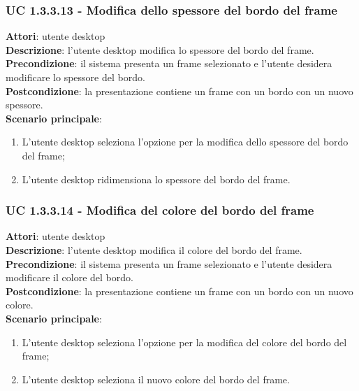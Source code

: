 \subsubsection{UC 1.3.3.13 - Modifica dello spessore del bordo del frame}{
	\label{uc1.3.3.13}
	\textbf{Attori}: utente desktop \\
	\textbf{Descrizione}: l'utente desktop modifica lo spessore del bordo del frame. \\
	\textbf{Precondizione}: il sistema presenta un frame selezionato e l'utente desidera modificare lo spessore del bordo.	\\
	\textbf{Postcondizione}: la presentazione contiene un frame con un bordo con un nuovo spessore.	\\
	\textbf{Scenario principale}:
	\begin{enumerate}
		\item L'utente desktop seleziona l'opzione per la modifica dello spessore del bordo del frame;
		\item L'utente desktop ridimensiona lo spessore del bordo del frame.
	\end{enumerate}
	}
\subsubsection{UC 1.3.3.14 - Modifica del colore del bordo del frame}{
	\label{uc1.3.3.14}
	\textbf{Attori}: utente desktop \\
	\textbf{Descrizione}: l'utente desktop modifica il colore del bordo del frame. \\
	\textbf{Precondizione}: il sistema presenta un frame selezionato e l'utente desidera modificare il colore del bordo.	\\
	\textbf{Postcondizione}: la presentazione contiene un frame con un bordo con un nuovo colore.	\\
	\textbf{Scenario principale}:
	\begin{enumerate}
		\item L'utente desktop seleziona l'opzione per la modifica del colore del bordo del frame;
		\item L'utente desktop seleziona il nuovo colore del bordo del frame.
	\end{enumerate}
	}
